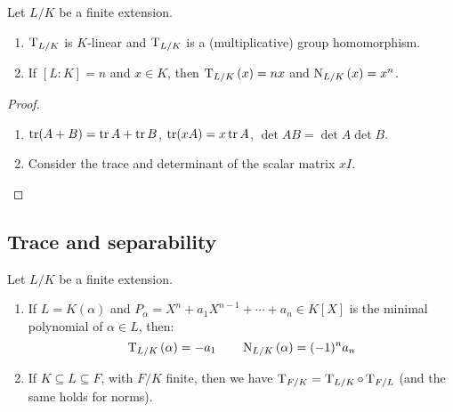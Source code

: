 \begin{lemma}
\label{lemma:95}
  Let $L/K$ be a finite extension.
  \begin{enumerate}
  \item $\operatorname{T}_{L/K}$ is $K$-linear and $\operatorname{T}_{L/K}$ is a (multiplicative) group homomorphism.
  \item If $[L : K] = n$ and $x \in K$, then $\operatorname{T}_{L/K}\left(x\right) = nx$ and $\operatorname{N}_{L/K}\left(x\right) = x^n$.
  \end{enumerate}
\end{lemma}

\begin{proof}
  \begin{enumerate}
  \item $\operatorname{tr} (A + B) = \operatorname{tr} A + \operatorname{tr} B$, $\operatorname{tr} (xA) = x \operatorname{tr} A$, $\det AB = \det A \det B$.
  \item Consider the trace and determinant of the scalar matrix $xI$.
  \end{enumerate}
\end{proof}

\subsection{Trace and separability}

\begin{lemma}
  \label{lemma:96}
Let $L/K$ be a finite extension.
\begin{enumerate}
\item If $L = K(\alpha)$ and $P_\alpha = X^n + a_1X^{n-1} + \dotsb + a_n \in K[X]$ is the minimal polynomial of $\alpha \in L$, then:
\[
\operatorname{T}_{L/K}\left(\alpha\right) = -a_1 \qquad \operatorname{N}_{L/K}\left(\alpha\right) = (-1)^na_n
\]
\item If $K \subseteq L \subseteq F$, with $F/K$ finite, then we have $\operatorname{T}_{F/K} = \operatorname{T}_{L/K} \circ \operatorname{T}_{F/L}$ (and the same holds for norms).
\end{enumerate}
\end{lemma}

